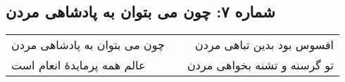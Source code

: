 \begin{center}
\section*{شماره ۷: چون می بتوان به پادشاهی مردن}
\label{sec:007}
\begin{longtable}{l p{0.5cm} r}
چون می بتوان به پادشاهی مردن
&&
افسوس بود بدین تباهی مردن
\\
عالم همه پرمایدهٔ انعام است
&&
تو گرسنه و تشنه بخواهی مردن
\\
\end{longtable}
\end{center}
